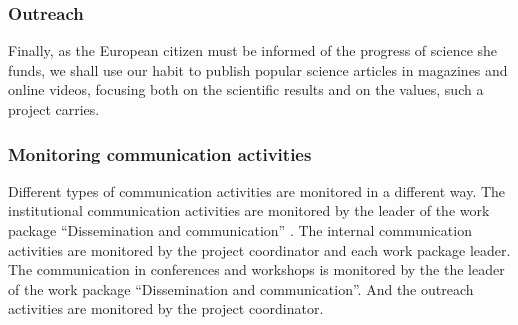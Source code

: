 \subsubsection*{Outreach} 

Finally, as the European citizen must be informed of the progress of
science she funds, we shall use our habit to publish popular science
articles in magazines and online videos, focusing both on the
scientific results and on the values, such a project carries.

\subsubsection*{Monitoring communication activities}

Different types of communication activities are monitored in a
different way.  The institutional communication activities are
monitored by the leader of the work package ``Dissemination and
communication'' . The internal communication activities are monitored
by the project coordinator and each work package leader. The communication 
in conferences and workshops is monitored by the 
the leader of the work package ``Dissemination and
communication''. And the outreach activities are monitored by the 
project coordinator.

